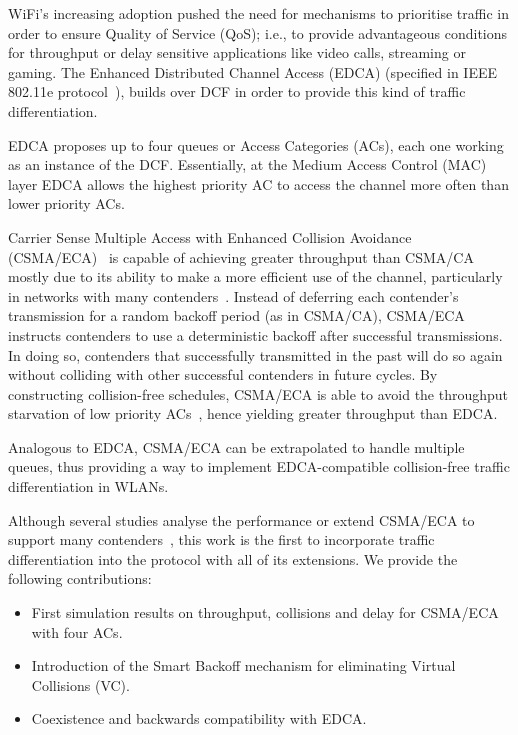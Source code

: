 \documentclass[a4paper,journal]{IEEEtran}
\begin{document}
WiFi's increasing adoption pushed the need for mechanisms to prioritise traffic in order to ensure Quality of Service (QoS); i.e., to provide advantageous conditions for throughput or delay sensitive applications like video calls, streaming or gaming. The Enhanced Distributed Channel Access (EDCA) (specified in IEEE 802.11e protocol~\cite{80211e}), builds over DCF in order to provide this kind of traffic differentiation.

EDCA proposes up to four queues or Access Categories (ACs), each one working as an instance of the DCF. Essentially, at the Medium Access Control (MAC) layer EDCA allows the highest priority AC to access the channel more often than lower priority ACs.

Carrier Sense Multiple Access with Enhanced Collision Avoidance (CSMA/ECA)~\cite{sanabria2014high,research2standards} is capable of achieving greater throughput than CSMA/CA mostly due to its ability to make a more efficient use of the channel, particularly in networks with many contenders~\cite{sanabria2014high}. Instead of deferring each contender's transmission for a random backoff period (as in CSMA/CA), CSMA/ECA instructs contenders to use a deterministic backoff after successful transmissions. In doing so, contenders that successfully transmitted in the past will do so again without colliding with other successful contenders in future cycles. By constructing collision-free schedules, CSMA/ECA is able to avoid the throughput starvation of low priority ACs~\cite{990806}, hence yielding greater throughput than EDCA.

Analogous to EDCA, CSMA/ECA can be extrapolated to handle multiple queues, thus providing a way to implement EDCA-compatible collision-free traffic differentiation in WLANs. 

Although several studies analyse the performance or extend CSMA/ECA to support many contenders~\cite{bellalta2009vtc,barcelo2011tcf,ECA-DEMO-INFOCOM14,research2standards,sanabria2014high}, this work is the first to incorporate traffic differentiation into the protocol with all of its extensions. We provide the following contributions:

\begin{itemize}
	\item First simulation results on throughput, collisions and delay for CSMA/ECA with four ACs.
	\item Introduction of the Smart Backoff mechanism for eliminating Virtual Collisions (VC).
	\item Coexistence and backwards compatibility with EDCA.
\end{itemize}
\end{document}
